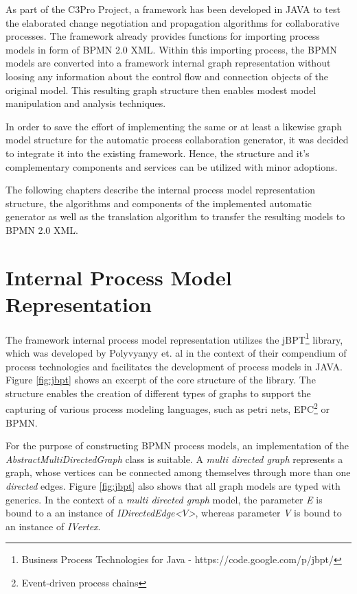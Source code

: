 As part of the C3Pro Project, a framework has been developed in JAVA to test the elaborated change negotiation and propagation algorithms for collaborative processes. The framework already provides functions for importing process models in form of BPMN 2.0 XML. Within this importing process, the BPMN models are converted into a framework internal graph representation without loosing any information about the control flow and connection objects of the original model. This resulting graph structure then enables modest model manipulation and analysis techniques.\par
In order to save the effort of implementing the same or at least a likewise graph model structure for the automatic process collaboration generator, it was decided to integrate it into the existing framework. Hence, the structure and it's complementary components and services can be utilized with minor adoptions.\par
The following chapters describe the internal process model representation structure, the algorithms and components of the implemented automatic generator as well as the translation algorithm to transfer the resulting models to BPMN 2.0 XML.

\section{Internal Process Model Representation}
The framework internal process model representation utilizes the jBPT\footnote{Business Process Technologies for Java - https://code.google.com/p/jbpt/} library, which was developed by Polyvyanyy et. al \cite{jbpt} in the context of their compendium of process technologies and facilitates the development of process models in JAVA. Figure \ref{fig:jbpt} shows an excerpt of the core structure of the library. The structure enables the creation of different types of graphs to support the capturing of various process modeling languages, such as petri nets, EPC\footnote{Event-driven process chains} or BPMN.\par
For the purpose of constructing BPMN process models, an implementation of the \textit{AbstractMultiDirectedGraph} class is suitable. A \textit{multi directed graph} represents a graph, whose vertices can be connected among themselves through more than one \textit{directed} edges\cite{graph_theory}. Figure \ref{fig:jbpt} also shows that all graph models are typed with generics. In the context of a \textit{multi directed graph} model, the parameter \textit{E} is bound to a an instance of \textit{IDirectedEdge\textless$V$\textgreater}, whereas parameter \textit{V} is bound to an instance of \textit{IVertex}. 


